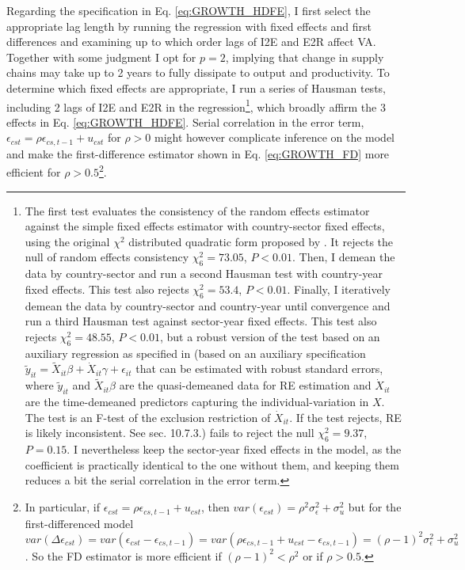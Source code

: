 \documentclass[a4paper]{article}
\begin{document}
Regarding the specification in Eq. \ref{eq:GROWTH_HDFE}, I first select the appropriate lag length by running the regression with fixed effects and first differences and examining up to which order lags of I2E and E2R affect VA. Together with some judgment I opt for $p = 2$, implying that change in supply chains may take up to 2 years to fully dissipate to output and productivity. To determine which fixed effects are appropriate, I run a series of Hausman tests, including 2 lags of I2E and E2R in the regression\footnote{The first test evaluates the consistency of the random effects estimator against the simple fixed effects estimator with country-sector fixed effects, using the original $\chi^2$ distributed quadratic form proposed by \citet{hausman1978specification}. It rejects the null of random effects consistency $\chi^2_6 = 73.05$, $P < 0.01$. Then, I demean the data by country-sector and run a second Hausman test with country-year fixed effects. This test also rejects $\chi^2_6 = 53.4$, $P < 0.01$. Finally, I iteratively demean the data by country-sector and country-year until convergence and run a third Hausman test against sector-year fixed effects. This test also rejects $\chi^2_6 = 48.55$, $P < 0.01$, but a robust version of the test based on an auxiliary regression as specified in \citet{wooldridge2010econometric} (based on an auxiliary specification $\tilde{y}_{it} = \tilde{X}_{it}\beta + \dot{X}_{it}\gamma + \epsilon_{it}$ that can be estimated with robust standard errors, where  $\tilde{y}_{it} $ and $\tilde{X}_{it}\beta$ are the quasi-demeaned data for RE estimation and $\dot{X}_{it}$ are the time-demeaned predictors capturing the individual-variation in $X$. The test is an F-test of the exclusion restriction of $\dot{X}_{it}$. If the test rejects, RE is likely inconsistent. See \citet{wooldridge2010econometric} sec. 10.7.3.) fails to reject the null $\chi^2_6 = 9.37$, $P = 0.15$. I nevertheless keep the sector-year fixed effects in the model, as the coefficient is practically identical to the one without them, and keeping them reduces a bit the serial correlation in the error term.}, which broadly affirm the 3 effects in Eq. \ref{eq:GROWTH_HDFE}. Serial correlation in the error term, $\epsilon_{cst} = \rho \epsilon_{cs,t-1} + u_{cst}$ for $\rho > 0$ might however complicate inference on the model and make the first-difference estimator shown in Eq. \ref{eq:GROWTH_FD} more efficient for $\rho > 0.5$\footnote{In particular, if $\epsilon_{cst} = \rho \epsilon_{cs,t-1} + u_{cst}$, then $var(\epsilon_{cst}) = \rho^2 \sigma^2_\epsilon + \sigma^2_u$ but for the first-differenced model $var(\Delta \epsilon_{cst}) = var(\epsilon_{cst} - \epsilon_{cs,t-1}) = var(\rho \epsilon_{cs,t-1} + u_{cst} - \epsilon_{cs,t-1}) = (\rho-1)^2 \sigma^2_\epsilon + \sigma^2_u$. So the FD estimator is more efficient if $(\rho-1)^2<\rho^2$ or if $\rho > 0.5$.}.
\end{document}
